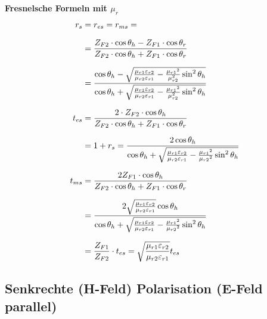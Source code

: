 \textbf{Fresnelsche Formeln mit $\mu_r$}
\begin{equation*}
	\setlength{\jot}{10pt}
	\begin{aligned}
		r_s    & =  r_{es} = r_{ms} =                                                                                                                                            \\
		& = \frac{Z_{F2} \cdot \cos \theta_h-Z_{F1} \cdot \cos \theta_r}{Z_{F2} \cdot \cos \theta_h+Z_{F1} \cdot \cos \theta_r}                                           \\
        & =\frac{\cos \theta_h-\sqrt{\frac{\mu_{r 1} \varepsilon_{r 2}}{\mu_{r 2} \varepsilon_{r 1}}-\frac{\mu_{r 1}{ }^2}{\mu_{r 2}^2} \sin ^2 \theta_h}}{\cos \theta_h+\sqrt{\frac{\mu_{r 1} \varepsilon_{r 2}}{\mu_{r 2} \varepsilon_{r 1}}-\frac{\mu_{r 1}{ }^2}{\mu_{r 2}^2} \sin ^2 \theta_h}} \\
		t_{es} & =\frac{2 \cdot	 Z_{F2} \cdot \cos \theta_h}{Z_{F2} \cdot \cos \theta_h+Z_{F1} \cdot \cos \theta_r}                                                              \\
        & = 1+r_s =\frac{2 \cos \theta_h}{\cos \theta_h+\sqrt{\frac{\mu_{r 1} \varepsilon_{r 2}}{\mu_{r 2} \varepsilon_{r 1}}-\frac{\mu_{r 1}{ }^2}{\mu_{r 2}{ }^2} \sin ^2 \theta_h}} \\
		t_{ms} & = \frac{2 Z_{F1} \cdot \cos \theta_h}{Z_{F2} \cdot \cos \theta_h+Z_{F1} \cdot \cos \theta_r}                                                              \\
		& =\frac{2 \sqrt{\frac{\mu_{r 1} \varepsilon_{r 2}}{\mu_{r 2} \varepsilon_{r 1}}} \cos \theta_h}{\cos \theta_h+\sqrt{\frac{\mu_{r 1} \varepsilon_{r 2}}{\mu_{r 2} \varepsilon_{r 1}}-\frac{\mu_{r 1}{ }^2}{\mu_{r 2}{ }^2} \sin ^2 \theta_h}}
		\\
		& = \frac{Z_{F1}}{Z_{F2}}\cdot t_{es} =\sqrt{\frac{\mu_{r 1} \varepsilon_{r 2}}{\mu_{r 2} \varepsilon_{r 1}}} t_{e s}                                                                                                                   
	\end{aligned}
\end{equation*}


\subsection{Senkrechte (H-Feld) Polarisation (E-Feld parallel) }
\begin{center}

\end{center}

